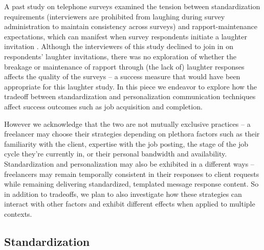 A past study on telephone surveys examined the tension between standardization requirements (interviewers are prohibited from laughing during survey administration to maintain consistency across surveys) and rapport-maintenance expectations, which can manifest when survey respondents initiate a laughter invitation \cite{rapport}. Although the interviewers of this study declined to join in on respondents' laughter invitations, there was no exploration of whether the breakage or maintenance of rapport through (the lack of) laughter responses affects the quality of the surveys {-- a success measure that would have been appropriate for this laughter study}. In this piece we endeavor to explore {how the tradeoff between standardization and personalization communication techniques affect success outcomes such as job acquisition and completion.} 


However we acknowledge that the two are not mutually exclusive practices -- a freelancer may choose their strategies depending on plethora factors such as their familiarity with the client, expertise with the job posting, the stage of the job cycle they're currently in, or their personal bandwidth and availability. Standardization and personalization may also be exhibited in a different ways -- freelancers may remain temporally consistent in their responses to client requests while remaining delivering standardized, templated message response content. So in addition to tradeoffs, we plan to also investigate how these strategies can interact with other factors and exhibit different effects when applied to multiple contexts.

\subsection{Standardization}

